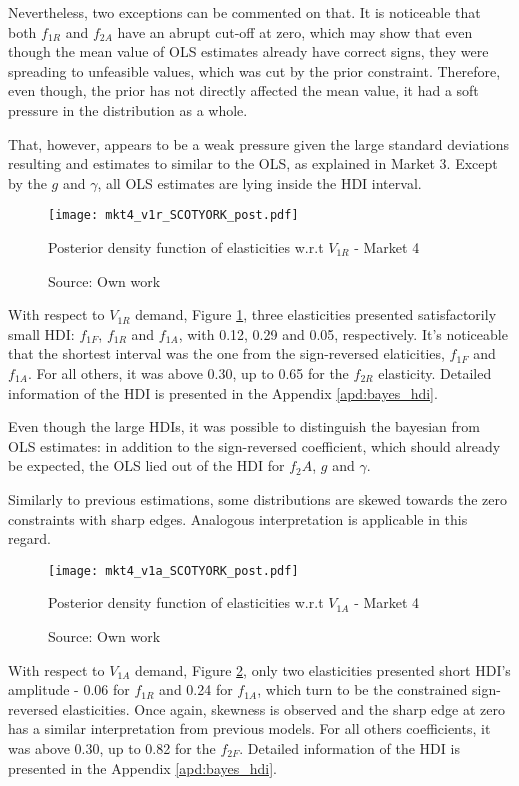Nevertheless, two exceptions can be commented on that. It is noticeable that both $f_{1R}$ and $f_{2A}$ have an abrupt cut-off at zero, which may show that even though the mean value of OLS estimates already have correct signs, they were spreading to unfeasible values, which was cut by the prior constraint. Therefore, even though, the prior has not directly affected the mean value, it had a soft pressure in the distribution as a whole. 

That, however, appears to be a weak pressure given the large standard deviations resulting and estimates to similar to the OLS, as explained in Market 3. Except by the $g$ and $\gamma$, all OLS estimates are lying inside the HDI interval.

\begin{figure}[H]
\centering
\texttt{[image: mkt4\_v1r\_SCOTYORK\_post.pdf]}
\caption{Posterior density function of elasticities w.r.t $V_{1R}$ - Market 4}
\label{fig:mkt4_v1r_SCOTYORK_post}
\caption*{Source: Own work}
\end{figure} 

With respect to $V_{1R}$ demand, Figure \ref{fig:mkt4_v1r_SCOTYORK_post}, three elasticities presented satisfactorily small HDI: $f_{1F}$, $f_{1R}$ and $f_{1A}$, with 0.12, 0.29 and 0.05, respectively. It's noticeable that the shortest interval was the one from the sign-reversed elaticities, $f_{1F}$ and $f_{1A}$. For all others, it was above 0.30, up to 0.65 for the $f_{2R}$ elasticity. Detailed information of the HDI is presented in the Appendix \ref{apd:bayes_hdi}. 

Even though the large HDIs, it was possible to distinguish the bayesian from OLS estimates: in addition to the sign-reversed coefficient, which should already be expected, the OLS lied out of the HDI for $f_2A$, $g$ and $\gamma$.

Similarly to previous estimations, some distributions are skewed towards the zero constraints with sharp edges. Analogous interpretation is applicable in this regard.

\begin{figure}[H]
\centering
\texttt{[image: mkt4\_v1a\_SCOTYORK\_post.pdf]}
\caption{Posterior density function of elasticities w.r.t $V_{1A}$ - Market 4}
\label{fig:mkt4_v1a_SCOTYORK_post}
\caption*{Source: Own work}
\end{figure} 

With respect to $V_{1A}$ demand, Figure \ref{fig:mkt4_v1a_SCOTYORK_post}, only two elasticities presented short HDI's amplitude  - 0.06 for $f_{1R}$ and 0.24 for $f_{1A}$, which turn to be the constrained sign-reversed elasticities. Once again, skewness is observed and the sharp edge at zero has a similar interpretation from previous models. For all others coefficients, it was above 0.30, up to 0.82 for the $f_{2F}$. Detailed information of the HDI is presented in the Appendix \ref{apd:bayes_hdi}. 

